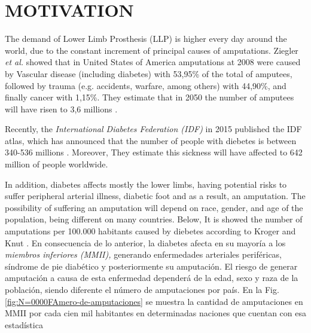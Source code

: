 \documentclass[12pt,english]{article}
\begin{document}
\section{MOTIVATION}

The demand of Lower Limb Prosthesis (LLP) is higher every day around the world, due to the constant increment of principal causes of amputations. Ziegler \emph{et al.}\cite{Ziegler-Graham2008} showed that in United States of America amputations at 2008 were caused by Vascular disease (including diabetes) with 53,95\% of the total of amputees, followed by trauma (e.g. accidents, warfare, among others) with 44,90\%, and finally cancer with 1,15\%. They estimate that in 2050 the number of amputees will have risen to 3,6 millions \cite{Ziegler-Graham2008}. 

Recently, the \emph{International Diabetes Federation (IDF)
} in 2015 published the IDF atlas, which has announced that the number of people with diebetes is between 340-536 millions \cite{IDF2015}. Moreover, They estimate this sickness will have affected to 642 million of people worldwide.
  
In addition, diabetes affects mostly the lower limbs, having potential risks to suffer peripheral arterial illness, diabetic foot and as a result, an amputation. The possibility of suffering an amputation will depend on race, gender, and age of the population, being different on many countries. Below, It is showed the number of amputations per 100.000 habitants caused by diebetes according to Kroger and Knut \cite{KrogerKnut2015}. 
En consecuencia de lo anterior, la diabetes afecta en su mayoría a
los \emph{miembros inferiores (MMII),
}generando enfermedades arteriales periféricas, síndrome de pie diabético
y posteriormente su amputación. El riesgo de generar amputación a
causa de esta enfermedad dependerá de la edad, sexo y raza de la población,
siendo diferente el número de amputaciones por país. En la Fig. \ref{fig:N=0000FAmero-de-amputaciones}
se muestra la cantidad de amputaciones en MMII por cada cien mil habitantes
en determinadas naciones que cuentan con esa estadística 
\end{document}
